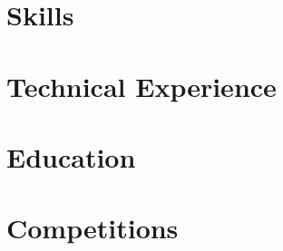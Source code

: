 \documentclass[letter,10pt]{article}
\begin{document}
\section{Skills}


\section{Technical Experience}


\section{Education}


% 

\section{Competitions}


% 
\end{document}
